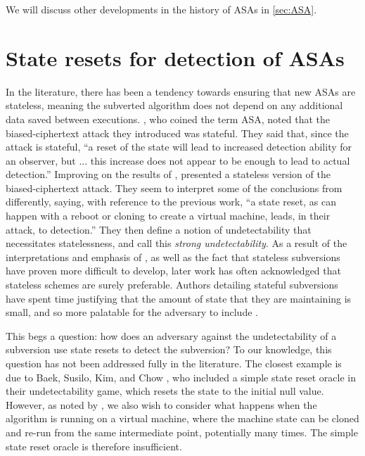We will discuss other developments in the history of ASAs in \autoref{sec:ASA}.


\section{State resets for detection of ASAs}
In the literature, there has been a tendency towards ensuring that new ASAs are stateless, meaning the subverted algorithm does not depend on any additional data saved between executions. \cite{C:BelPatRog14}, who coined the term ASA, noted that the biased-ciphertext attack they introduced was stateful. They said that, since the attack is stateful, ``a reset of the state will lead to increased detection ability for an observer, but ... this increase does not appear to be enough to lead to actual detection.'' Improving on the results of \cite{C:BelPatRog14}, \cite{CCS:BelJaeKan15} presented a stateless version of the biased-ciphertext attack. They seem to interpret some of the conclusions from \cite{C:BelPatRog14} differently, saying, with reference to the previous work, ``a state reset, as can happen with a reboot or cloning to create a virtual machine, leads, in their attack, to detection.'' They then define a notion of undetectability that necessitates statelessness, and call this \emph{strong undetectability}. As a result of the interpretations and emphasis of \cite{CCS:BelJaeKan15}, as well as the fact that stateless subversions have proven more difficult to develop, later work has often acknowledged that stateless schemes are surely preferable. Authors detailing stateful subversions have spent time justifying that the amount of state that they are maintaining is small, and so more palatable for the adversary to include \cite{BSKC2019,AC:CheHuaYun20}.

This begs a question: how does an adversary against the undetectability of a subversion use state resets to detect the subversion? To our knowledge, this question has not been addressed fully in the literature. The closest example is due to Baek, Susilo, Kim, and Chow \cite{BSKC2019}, who included a simple state reset oracle in their undetectability game, which resets the state to the initial null value. However, as noted by \cite{CCS:BelJaeKan15}, we also wish to consider what happens when the algorithm is running on a virtual machine, where the machine state can be cloned and re-run from the same intermediate point, potentially many times. The simple state reset oracle is therefore insufficient.

